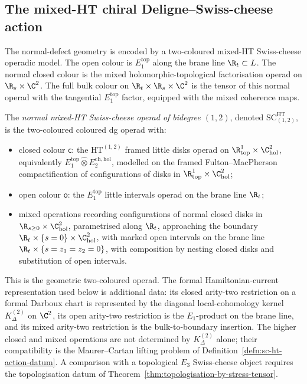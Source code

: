 \subsection{The mixed-HT chiral Deligne--Swiss-cheese action}
\label{ssec:sc-ht-deligne}

The normal-defect geometry is encoded by a two-coloured mixed-HT
Swiss-cheese operadic model.  The open colour is
\(E_1^{\mathrm{top}}\) along the brane line \(\R_t\subset L\).  The
normal closed colour is the
mixed holomorphic-topological factorisation operad on
\(\R_s\times\C^2\).  The full bulk colour on
\(\R_t\times\R_s\times\C^2\) is the tensor of this normal operad with
the tangential \(E_1^{\mathrm{top}}\) factor, equipped with the mixed
coherence maps.

\begin{defn}
\label{defn:sc-ht-operad}
The \emph{normal mixed-HT Swiss-cheese operad of bidegree \((1,2)\)},
denoted \(\mathrm{SC}^{\mathrm{HT}}_{(1,2)}\), is the two-coloured
coloured dg operad with:
\begin{itemize}
  \item closed colour \(\mathsf c\): the \(\mathrm{HT}^{(1,2)}\)
        framed little disks operad on \(\R^1_{\mathrm{top}}\times\C^2_{\mathrm{hol}}\),
        equivalently \(E_1^{\mathrm{top}}\widehat\otimes E_2^{\mathrm{ch,hol}}\),
        modelled on the framed Fulton--MacPherson compactification of
        configurations of disks in
        \(\R^1_{\mathrm{top}}\times\C^2_{\mathrm{hol}}\);
  \item open colour \(\mathsf o\): the \(E_1^{\mathrm{top}}\) little
        intervals operad on the brane line \(\R_t\);
  \item mixed operations recording configurations of normal closed disks
        in \(\R_{s\ge 0}\times\C^2_{\mathrm{hol}}\), parametrised along
        \(\R_t\), approaching the boundary
        \(\R_t\times\{s=0\}\times\C^2_{\mathrm{hol}}\), with marked open
        intervals on the brane line
        \(\R_t\times\{s=z_1=z_2=0\}\), with composition by nesting
        closed disks and substitution of open intervals.
\end{itemize}
This is the geometric two-coloured operad.  The formal
Hamiltonian-current representation used below is additional data: its
closed arity-two restriction on a formal Darboux chart is represented by
the diagonal local-cohomology kernel \(K^{(2)}_\Delta\) on \(\C^2\), its
open arity-two restriction is the \(E_1\)-product on the brane line, and
its mixed arity-two restriction is the bulk-to-boundary insertion.  The
higher closed and mixed operations are not determined by
\(K^{(2)}_\Delta\) alone; their compatibility is the Maurer--Cartan
lifting problem of Definition~\ref{defn:sc-ht-action-datum}.  A
comparison with a topological \(E_3\) Swiss-cheese object requires the
topologisation datum of
Theorem~\ref{thm:topologisation-by-stress-tensor}.
\end{defn}

